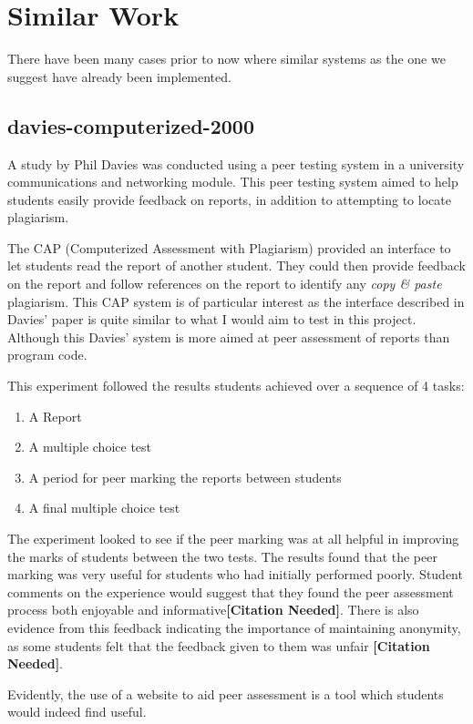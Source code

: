 \documentclass[a4paper,11pt]{report}
\newcommand{\cn}{\textbf{[Citation Needed]}}
\begin{document}
\section{Similar Work}
There have been many cases prior to now where similar systems as the one we suggest have already been implemented. 

\subsection{davies-computerized-2000}
A study by Phil Davies\cite{davies_computerized_2000} was conducted using a peer testing system in a university communications and networking module. This peer testing system aimed to help students easily provide feedback on reports, in addition to attempting to locate plagiarism.\par
The CAP (Computerized Assessment with Plagiarism) provided an interface to let students read the report of another student. They could then provide feedback on the report and follow references on the report to identify any \textit{copy \& paste} plagiarism. This CAP system is of particular interest as the interface described in Davies' paper is quite similar to what I would aim to test in this project. Although this Davies' system is more aimed at peer assessment of reports than program code.\par
This experiment followed the results students achieved over a sequence of 4 tasks:
\begin{enumerate}
\item A Report
\item A multiple choice test
\item A period for peer marking the reports between students
\item A final multiple choice test
\end{enumerate}
The experiment looked to see if the peer marking was at all helpful in improving the marks of students between the two tests. The results found that the peer marking was very useful for students who had initially performed poorly. Student comments on the experience would suggest that they found the peer assessment process both enjoyable and informative\cn. There is also evidence from this feedback indicating the importance of maintaining anonymity, as some students felt that the feedback given to them was unfair \cn.\par
Evidently, the use of a website to aid peer assessment is a tool which students would indeed find useful.
\end{document}
